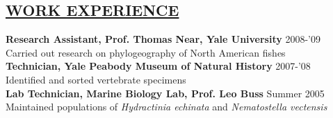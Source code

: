 \documentclass{res}
\begin{document}
\begin{resume}
\section{\underline{WORK EXPERIENCE}}
\textbf{Research Assistant, Prof. Thomas Near, Yale University} 2008-'09 \\ \vspace{0.3mm}	%
\hspace{4.5mm}Carried out research on phylogeography of North American fishes\\
\textbf{Technician, Yale Peabody Museum of Natural History} 2007-'08 \\ \vspace{0.3mm}	%
\hspace{4.5mm}Identified and sorted vertebrate specimens\\ 
\textbf{Lab Technician, Marine Biology Lab, Prof. Leo Buss} Summer 2005 \\ \vspace{0.3mm}	%
\hspace{4.5mm}Maintained populations of \textit{Hydractinia echinata} and \textit{Nematostella vectensis} 


\end{resume}
\end{document}
